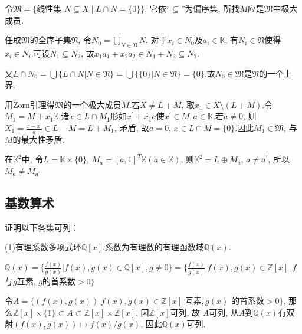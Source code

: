 \begin{solution}
令$\mathfrak{M}=\{\text{线性集 }N\subseteq X\mid L\cap N=\{0\}\}$, 
它依“$\subseteq$”为偏序集, 所找$M$应是$\mathfrak{M}$中极大成员.

任取$\mathfrak{M}$的全序子集$\mathfrak{N}$, 令$N_{0}=\bigcup_{N\in \mathfrak{N}}N$.
对于$x_{i}\in N_{0}$及$a_i\in\mathbb{K}$, 有$N_{i}\in \mathfrak{N}$使得$x_i\in N_i.$可设$N_1\subseteq N_2$, 故$x_1a_1+x_2a_2\in N_1+N_2 \subseteq N_2.$

又$L\cap N_0=\bigcup\{L\cap N | N\in \mathfrak{N}\}$$=\bigcup\{\{0\}| N\in \mathfrak{N}\}$$=\{0\}.$故$N_0 \in \mathfrak{M}$是$\mathfrak{N}$的一个上界.

用Zorn引理得$\mathfrak{M}$的一个极大成员$M.$若$X\neq L+M$, 取$x_1\in X\setminus (L+M).$令$M_1=M+x_1\mathbb{K}  .$诸$x\in L\cap M_1$形如$x^{\prime}+x_1a$使$x^{\prime}\in M, a\in \mathbb{K}.$若$a\neq 0$, 则$X_1=\frac{x-x^{\prime}}{a}\in L-M=L+M_1$, 矛盾, 故$a=0$, $x\in L\cap M=\{0\}.$因此$M_1\in \mathfrak{M}$, 与$M$的最大性矛盾.

在$\mathbb{K}^2$中, 令$L=\mathbb{K}\times\{0\}$, $M_a=[a, 1]^T\mathbb{K}(a\in\mathbb{K})$, 则$\mathbb{K}^2=L\oplus M_a$, $a\neq a^{\prime}$, 所以$M_a\neq M_{a^{\prime}}$
\end{solution}


\subsection{基数算术}
\begin{1}
证明以下各集可列：

(1)有理系数多项式环$\mathbb{Q}[x]$.系数为有理数的有理函数域$\mathbb{Q}(x).$
\end{1}
\begin{solution}
$\mathbb{Q}(x)=\{\frac{f(x)}{g(x)}\vert f(x), g(x)\in\mathbb{Q}[x], g\neq0\}=\{\frac{f(x)}{g(x)}|f(x), g(x)\in\mathbb{Z}[x], f$与$g$互素, $g$的首系数$>0\}$

令$A=\{(f(x), g(x))|f(x), g(x)\in\mathbb{Z}[x]\text{ 互素}, g(x)\text{ 的首系数}>0\}$, 
那么$\mathbb{Z}[x]\times\{1\}\subset A\subset\mathbb{Z}[x]\times\mathbb{Z}[x]$, 
因$\mathbb{Z}[x]$可列, 故 $A$可列, 
从$A$到$\mathbb{Q}(x)$有双射$(f(x), g(x))\mapsto f(x)/g(x)$, 因此$\mathbb{Q}(x)$可列.
\end{solution}


